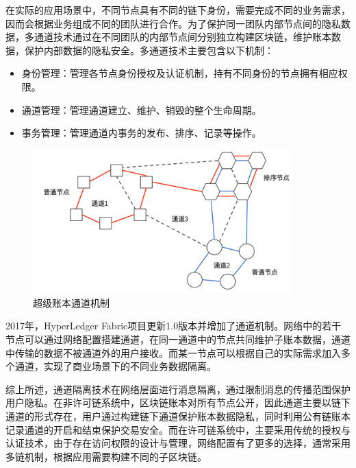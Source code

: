 在实际的应用场景中，不同节点具有不同的链下身份，需要完成不同的业务需求，因而会根据业务组成不同的团队进行合作。为了保护同一团队内部节点间的隐私数据，多通道技术通过在不同团队的内部节点间分别独立构建区块链，维护账本数据，保护内部数据的隐私安全。多通道技术主要包含以下机制：

\begin{itemize}
	\item 身份管理：管理各节点身份授权及认证机制，持有不同身份的节点拥有相应权限。
	\item 通道管理：管理通道建立、维护、销毁的整个生命周期。
	\item 事务管理：管理通道内事务的发布、排序、记录等操作。
\end{itemize}

\begin{figure}
\centering
\includegraphics[width=10cm]{figures/hyper-channel.png}
\caption{超级账本通道机制}
\label{fig:hyper-channel}
\end{figure}

2017年，HyperLedger Fabric项目更新1.0版本并增加了通道机制。网络中的若干节点可以通过网络配置搭建通道，在同一通道中的节点共同维护子账本数据，通道中传输的数据不被通道外的用户接收。而某一节点可以根据自己的实际需求加入多个通道，实现了商业场景下的不同业务数据隔离。

综上所述，通道隔离技术在网络层面进行消息隔离，通过限制消息的传播范围保护用户隐私。在非许可链系统中，区块链账本对所有节点公开，因此通道主要以链下通道的形式存在，用户通过构建链下通道保护账本数据隐私，同时利用公有链账本记录通道的开启和结束保护交易安全。而在许可链系统中，主要采用传统的授权与认证技术，由于存在访问权限的设计与管理，网络配置有了更多的选择，通常采用多链机制，根据应用需要构建不同的子区块链。
